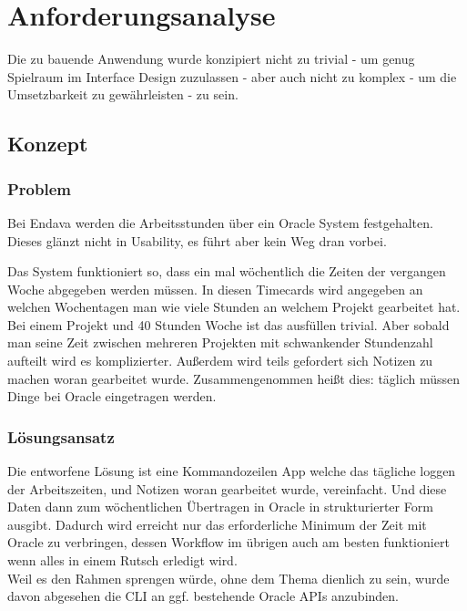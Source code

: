 \documentclass[oneside,bibliography=totocnumbered,BCOR=5mm]{scrbook}
\begin{document}
\chapter{Anforderungsanalyse}

Die zu bauende Anwendung wurde konzipiert nicht zu trivial - um genug
Spielraum im Interface Design zuzulassen - aber auch nicht zu komplex - um die
Umsetzbarkeit zu gewährleisten - zu sein.

\section{Konzept}
\subsection{Problem}

Bei Endava werden die Arbeitsstunden über ein Oracle System festgehalten. Dieses
glänzt nicht in Usability, es führt aber kein Weg dran vorbei.


Das System funktioniert so, dass ein mal wöchentlich die Zeiten der vergangen
Woche abgegeben werden müssen. In diesen Timecards wird angegeben an welchen
Wochentagen man wie viele Stunden an welchem Projekt gearbeitet hat. Bei einem
Projekt und 40 Stunden Woche ist das ausfüllen trivial. Aber sobald man seine
Zeit zwischen mehreren Projekten mit schwankender Stundenzahl aufteilt wird
es komplizierter. Außerdem wird teils gefordert sich Notizen zu machen woran
gearbeitet wurde. Zusammengenommen heißt dies: täglich müssen Dinge bei Oracle
eingetragen werden.


\subsection{Lösungsansatz}

Die entworfene Lösung ist eine Kommandozeilen App welche das tägliche loggen der
Arbeitszeiten, und Notizen woran gearbeitet wurde, vereinfacht. Und diese Daten
dann zum wöchentlichen Übertragen in Oracle in strukturierter Form ausgibt.
Dadurch wird erreicht nur das erforderliche Minimum der Zeit mit Oracle zu
verbringen, dessen Workflow im übrigen auch am besten funktioniert wenn alles in
einem Rutsch erledigt wird.
\\
Weil es den Rahmen sprengen würde, ohne dem Thema dienlich zu sein, wurde davon
abgesehen die CLI an ggf. bestehende Oracle APIs anzubinden.
\end{document}
